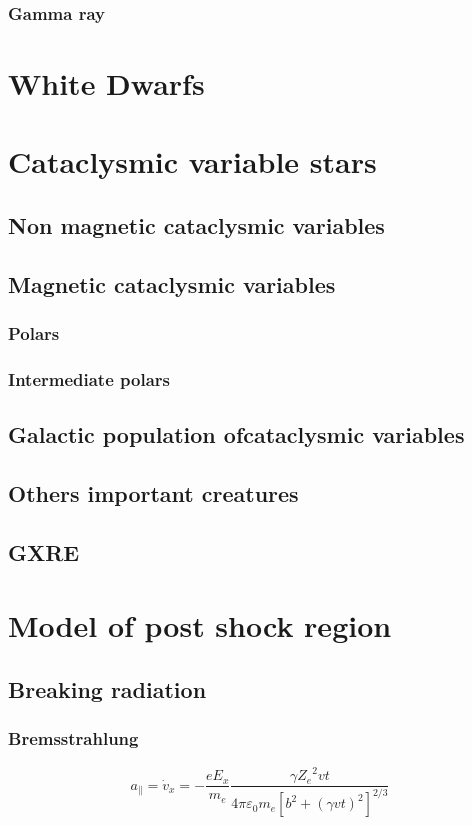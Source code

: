 \documentclass[oneside,a4paper,11pt]{report}
\begin{document}
    
\subsection{Gamma ray}
\chapter{White Dwarfs}


\chapter{Cataclysmic variable stars}
\section{Non magnetic cataclysmic variables} 
\section{Magnetic cataclysmic variables}
\subsection{Polars}
\subsection{Intermediate polars}
\section{Galactic population ofcataclysmic variables }
\section{Others important creatures}
\section{GXRE}



\chapter{Model of post shock region}
\section{Breaking radiation}
\subsection{Bremsstrahlung}
\begin{equation}
 a_{\parallel} = \dot{v}_x = -\frac{eE_x}{m_e}\frac{\gamma {Z_e}^2 vt}{4\pi \varepsilon_0 m_e \left [ b^2 + \left ( \gamma vt \right )^2  \right ]^{2/3}} 
\end{equation}
\end{document}
